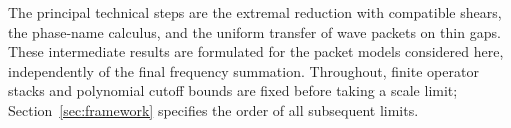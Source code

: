 \begin{samepage}
The principal technical steps are the extremal reduction with compatible
shears, the phase-name calculus, and the uniform transfer of wave packets
on thin gaps. These intermediate results are formulated for the packet
models considered here, independently of the final frequency summation.
Throughout,
finite operator stacks and polynomial cutoff bounds are fixed before
taking a scale limit; Section~\ref{sec:framework} specifies the order of
all subsequent limits.
\par
\end{samepage}

\clearpage
\tableofcontents
\clearpage
